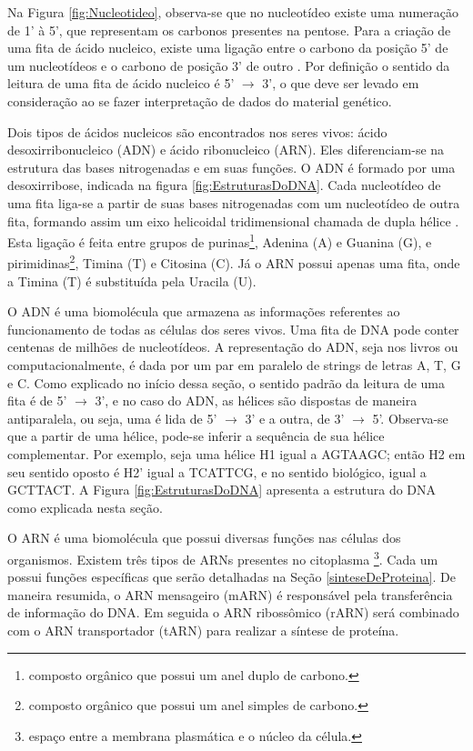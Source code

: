\indent Na Figura \ref{fig:Nucleotideo}, observa-se que no nucleotídeo existe uma numeração de 1' à 5', que representam os carbonos presentes na pentose. Para a criação de uma fita de ácido nucleico, existe uma ligação entre o carbono da posição 5' de um nucleotídeos e o carbono de posição 3' de outro \cite{setubal97}. Por definição o sentido da leitura de uma fita de ácido nucleico é 5' $\rightarrow$ 3', o que deve ser levado em consideração ao se fazer interpretação de dados do material genético.

\indent Dois tipos de ácidos nucleicos são encontrados nos seres vivos: ácido desoxirribonucleico (ADN) e ácido ribonucleico (ARN). Eles diferenciam-se na estrutura das bases nitrogenadas e em suas funções. O ADN é formado por uma desoxirribose, indicada na figura \ref{fig:EstruturasDoDNA}. Cada nucleotídeo de uma fita liga-se a partir de suas bases nitrogenadas com um nucleotídeo de outra fita, formando assim um eixo helicoidal tridimensional chamada de dupla hélice \cite{setubal97}. Esta ligação é feita entre grupos de purinas\footnote{composto orgânico que possui um anel duplo de carbono.}, Adenina (A) e Guanina (G), e pirimidinas\footnote{composto orgânico que possui um anel simples de carbono.}, Timina (T) e Citosina (C). Já o ARN possui apenas uma fita, onde a Timina (T) é substituída pela Uracila (U).

\indent O ADN é uma biomolécula que armazena as informações referentes ao funcionamento de todas as células dos seres vivos. Uma fita de DNA pode conter centenas de milhões de nucleotídeos. A representação do ADN, seja nos livros ou computacionalmente, é dada por um par em paralelo de strings de letras A, T, G e C. Como explicado no início dessa seção, o sentido padrão da leitura de uma fita é de 5' $\rightarrow$ 3', e no caso do ADN, as hélices são dispostas de maneira antiparalela, ou seja, uma é lida de 5' $\rightarrow$ 3' e a outra, de 3' $\rightarrow$ 5'. Observa-se que a partir de uma hélice, pode-se inferir a sequência de sua hélice complementar. Por exemplo, seja uma hélice H1 igual a AGTAAGC; então H2 em seu sentido oposto é H2' igual a TCATTCG, e no sentido biológico, igual a GCTTACT. A Figura \ref{fig:EstruturasDoDNA} apresenta a estrutura do DNA como explicada nesta seção.

\indent O ARN é uma biomolécula que possui diversas funções nas células dos organismos. Existem três tipos de ARNs presentes no citoplasma \footnote{espaço entre a membrana plasmática e o núcleo da célula.}. Cada um possui funções específicas que serão detalhadas na Seção \ref{sinteseDeProteina}. De maneira resumida, o ARN mensageiro (mARN) é responsável pela transferência de informação do DNA. Em seguida o ARN ribossômico (rARN) será combinado com o ARN transportador (tARN) para realizar a síntese de proteína.

